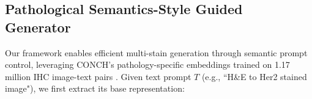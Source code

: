\documentclass[journal,twoside,web]{ieeecolor}
\newcommand{\revision}[1]{\textcolor{revisioncolor}{#1}}  %
\renewcommand{\revision}[1]{#1}%
\begin{document}
 



 \subsection{Pathological Semantics-Style Guided Generator}






Our framework enables efficient multi-stain generation through semantic prompt control, leveraging CONCH's pathology-specific embeddings trained on 1.17 million IHC image-text pairs \cite{lu2024visual}. Given text prompt $T$ (e.g., \revision{``H\&E to Her2 stained image"}), we first extract its base representation:

\end{document}
